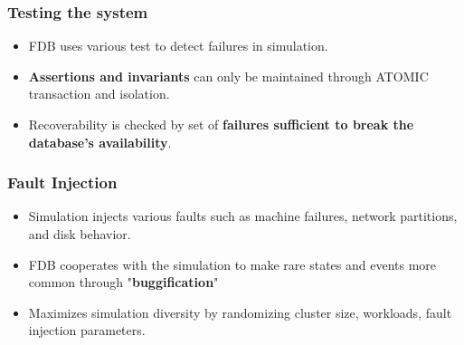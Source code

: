 

\begin{frame}
    \frametitle{Testing the system}
    \begin{itemize}
        \item FDB uses various test to detect failures in simulation.
        \item \textbf{Assertions and invariants} can only be maintained through ATOMIC transaction and isolation.
        \item Recoverability is checked by set of \textbf{failures sufficient to break
the database’s availability}.
    \end{itemize}
\end{frame}


\begin{frame}
    \frametitle{Fault Injection}
    \begin{itemize}
        \item Simulation injects various faults such as machine failures, network partitions, and disk behavior.
        \item FDB cooperates with the simulation to make rare states and events more common through "\textbf{buggification}"
        \item Maximizes simulation diversity by randomizing cluster size, workloads, fault injection parameters.
    \end{itemize}
\end{frame} 